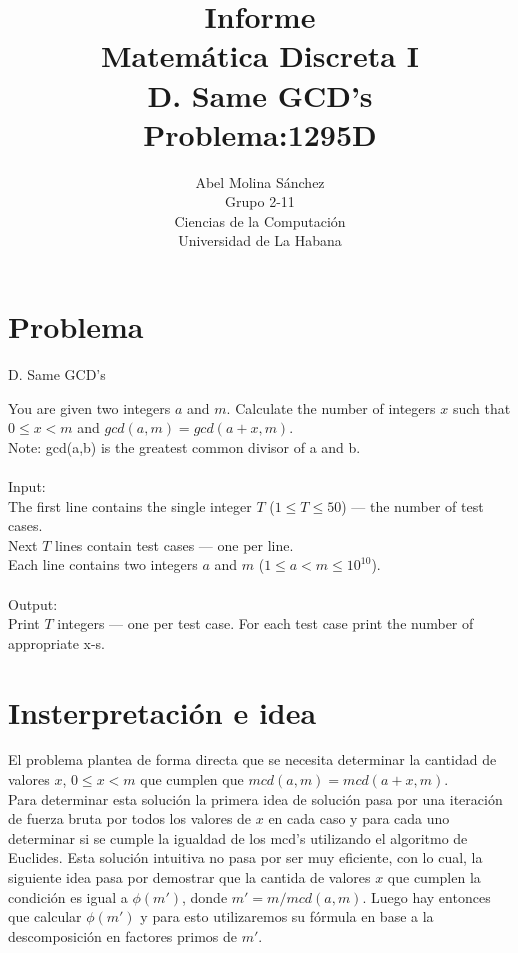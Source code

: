 \documentclass[12pt]{article}
\begin{document}
  \title{Informe\\
  Matem\'atica Discreta I\\
      D. Same GCD's\\
     Problema:1295D}
  \author{Abel Molina S\'anchez\\
  Grupo 2-11\\
  Ciencias de la Computaci\'on\\
  Universidad de La Habana}
    \maketitle  

\newpage

\section{Problema}


\begin{center}

D. Same GCD's
\end{center}

You are given two integers $a$ and $m$. Calculate the number of integers $x$ such that $0\leq x<m$ and $gcd(a,m)=gcd(a+x,m)$.\\
Note: gcd(a,b) is the greatest common divisor of a and b.\\
\\
Input:\\
The first line contains the single integer $T$ ($1\leq T\leq 50$) — the number of test cases.\\
Next $T$ lines contain test cases — one per line.\\ Each line contains two integers $a$ and $m$ ($1\leq a<m\leq 10^{10}$).\\
\\
Output:\\
Print $T$ integers — one per test case. For each test case print the number of appropriate x-s.\\





\section{Insterpretación e idea}

El problema plantea de forma directa que se necesita determinar la cantidad de valores $x$, $0\leq x< m$ que cumplen que 
$mcd(a,m)=mcd(a+x,m)$.\\
Para determinar esta soluci\'on la primera idea de soluci\'on pasa por una iteraci\'on de fuerza bruta por todos los valores de $x$ en cada
 caso y para cada uno determinar si se cumple la igualdad de los mcd's utilizando el algoritmo de Euclides. Esta soluci\'on intuitiva no pasa 
por ser muy eficiente, con lo cual, la siguiente idea pasa por demostrar que la cantida de valores $x$ que cumplen la condici\'on es igual a
$\phi(m')$, donde $m'= m/mcd(a,m)$. Luego hay entonces que calcular $\phi(m')$ y para esto utilizaremos su f\'ormula en base a la descomposici\'on en factores primos de $m'$.\\  
\end{document}
